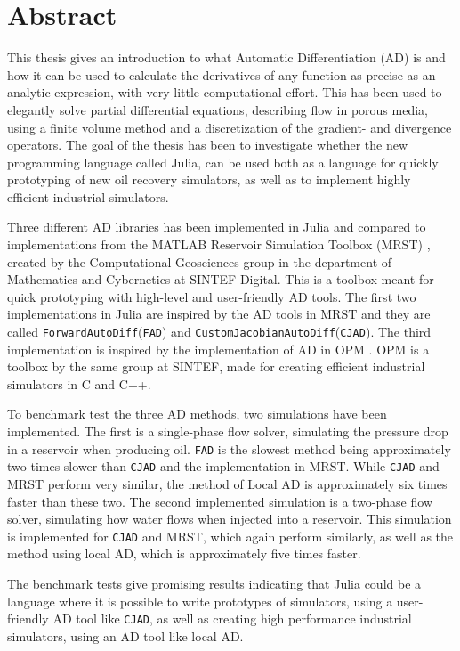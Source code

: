 \chapter*{Abstract}
This thesis gives an introduction to what Automatic Differentiation (AD) is and how it can be used to calculate the derivatives of any function as precise as an analytic expression, with very little computational effort. This has been used to elegantly solve partial differential equations, describing flow in porous media, using a finite volume method and a discretization of the gradient- and divergence operators. The goal of the thesis has been to investigate whether the new programming language called Julia, can be used both as a language for quickly prototyping of new oil recovery simulators, as well as to implement highly efficient industrial simulators.

Three different AD libraries has been implemented in Julia and compared to implementations from the MATLAB Reservoir Simulation Toolbox (MRST) \emph{\citep{mrstHomepage}}, created by the Computational Geosciences  group  in  the  department  of  Mathematics  and  Cybernetics  at  SINTEF Digital. This is a toolbox meant for quick prototyping with high-level and user-friendly AD tools. The first two implementations in Julia are inspired by the AD tools in MRST and they are called \texttt{ForwardAutoDiff}(\texttt{FAD}) and \texttt{CustomJacobianAutoDiff}(\texttt{CJAD}). The third implementation is inspired by the implementation of AD in OPM \emph{\citep{opm}}. OPM is a toolbox by the same group at SINTEF, made for creating efficient industrial simulators in C and C++. 

To benchmark test the three AD methods, two simulations have been implemented. The first is a single-phase flow solver, simulating the pressure drop in a reservoir when producing oil. \texttt{FAD} is the slowest method being approximately two times slower than \texttt{CJAD} and the implementation in MRST. While \texttt{CJAD} and MRST perform very similar, the method of Local AD is approximately six times faster than these two. The second implemented simulation is a two-phase flow solver, simulating how water flows when injected into a reservoir. This simulation is implemented for \texttt{CJAD} and MRST, which again perform similarly, as well as the method using local AD, which is approximately five times faster.

The benchmark tests give promising results indicating that Julia could be a language where it is possible to write prototypes of simulators, using a user-friendly AD tool like \texttt{CJAD}, as well as creating high performance industrial simulators, using an AD tool like local AD.